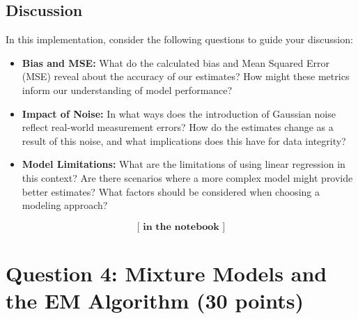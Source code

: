 \documentclass{article}
\begin{document}
\subsection*{Discussion}
In this implementation, consider the following questions to guide your discussion:

\begin{itemize}
    \item \textbf{Bias and MSE:} What do the calculated bias and Mean Squared Error (MSE) reveal about the accuracy of our estimates? How might these metrics inform our understanding of model performance?

    \item \textbf{Impact of Noise:} In what ways does the introduction of Gaussian noise reflect real-world measurement errors? How do the estimates change as a result of this noise, and what implications does this have for data integrity?

    \item \textbf{Model Limitations:} What are the limitations of using linear regression in this context? Are there scenarios where a more complex model might provide better estimates? What factors should be considered when choosing a modeling approach?
\end{itemize}
 
\[
\textbf{[ in the notebook ]}
\]




\section*{Question 4: Mixture Models and the EM Algorithm (30 points)}
\end{document}
